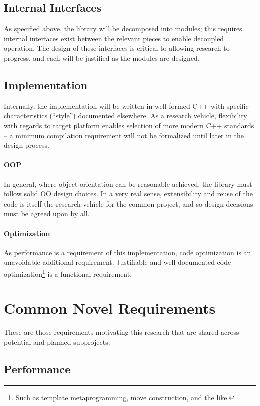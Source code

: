 \documentclass{article}
\begin{document}
\subsection{Internal Interfaces}

As specified above, the library will be decomposed into modules; this requires internal interfaces exist between the relevant pieces to enable decoupled operation.  The design of these interfaces is critical to allowing research to progress, and each will be justified as the modules are designed.

\subsection{Implementation}

Internally, the implementation will be written in well-formed C++ with specific characteristics (``style'') documented elsewhere.  As a research vehicle, flexibility with regards to target platform enables selection of more modern C++ standards -- a minimum compilation requirement will not be formalized until later in the design process.

\paragraph{OOP}  In general, where object orientation can be reasonable achieved, the library must follow solid OO design choices.  In a very real sense, extensibility and reuse of the code is itself the research vehicle for the common project, and so design decisions must be agreed upon by all.

\paragraph{Optimization}  As performance is a requirement of this implementation, code optimization is an unavoidable additional requirement.  Justifiable and well-documented code optimization\footnote{Such as template metaprogramming, move construction, and the like.} is a functional requirement.

\section{Common Novel Requirements}

These are those requirements motivating this research that are shared across potential and planned subprojects.

\subsection{Performance}
\end{document}
